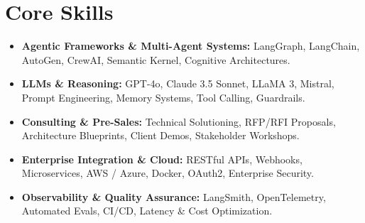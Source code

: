 \documentclass[a4paper,10pt]{article}
\begin{document}
\section{Core Skills}
\begin{itemize}
  \item \textbf{Agentic Frameworks \& Multi-Agent Systems:} LangGraph, LangChain, AutoGen, CrewAI, Semantic Kernel, Cognitive Architectures.
  \item \textbf{LLMs \& Reasoning:} GPT-4o, Claude 3.5 Sonnet, LLaMA 3, Mistral, Prompt Engineering, Memory Systems, Tool Calling, Guardrails.
  \item \textbf{Consulting \& Pre-Sales:} Technical Solutioning, RFP/RFI Proposals, Architecture Blueprints, Client Demos, Stakeholder Workshops.
  \item \textbf{Enterprise Integration \& Cloud:} RESTful APIs, Webhooks, Microservices, AWS / Azure, Docker, OAuth2, Enterprise Security.
  \item \textbf{Observability \& Quality Assurance:} LangSmith, OpenTelemetry, Automated Evals, CI/CD, Latency \& Cost Optimization.
\end{itemize}
\end{document}
